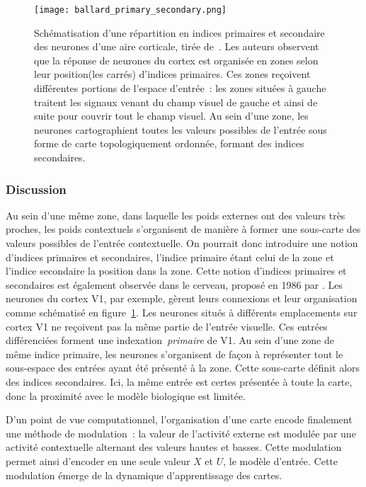 \documentclass[../main]{subfiles}
\begin{document}
\begin{figure}
	\centering\texttt{[image: ballard\_primary\_secondary.png]}
	\caption{Schématisation d'une répartition en indices primaires et secondaire des neurones d'une aire corticale, tirée de~\cite{ballard_cortical_1986}. 
	Les auteurs observent que la réponse de neurones du cortex est organisée en zones selon leur position(les carrés) d'indices primaires. 
	Ces zones reçoivent différentes portions de l'espace d'entrée~: les zones situées à gauche traitent les signaux venant du champ visuel de gauche et ainsi de suite pour couvrir tout le champ visuel.
	Au sein d'une zone, les neurones cartographient toutes les valeurs possibles de l'entrée sous forme de carte topologiquement ordonnée, formant des indices secondaires. \label{fig:ballard}}
\end{figure}

\subsubsection{Discussion}

Au sein d'une même zone, dans laquelle les poids externes ont des valeurs très proches, les poids contextuels s'organisent de manière à former une sous-carte des valeurs possibles de l'entrée contextuelle.
On pourrait donc introduire une notion d'indices primaires et secondaires, l'indice primaire étant celui de la zone et l'indice secondaire la position dans la zone.
Cette notion d'indices primaires et secondaires est également observée dans le cerveau, proposé en 1986 par \cite{ballard_cortical_1986}. Les neurones du cortex V1, par exemple, gèrent leurs connexions et leur organisation comme schématisé en figure~\ref{fig:ballard}.
Les neurones situés à différents emplacements sur cortex V1 ne reçoivent pas la même partie de l'entrée visuelle. Ces entrées différenciées forment une indexation~\emph{primaire} de V1. Au sein d'une zone de même indice primaire, les neurones s'organisent de façon à représenter tout le sous-espace des entrées ayant été présenté à la zone. Cette sous-carte définit alors des indices secondaires.
Ici, la même entrée est certes présentée à toute la carte, donc la proximité avec le modèle biologique est limitée.

D'un point de vue computationnel, l'organisation d'une carte encode finalement une méthode de modulation~: la valeur de l'activité externe est modulée par une activité contextuelle alternant des valeurs hautes et basses. Cette modulation permet ainsi d'encoder en une seule valeur $X$ et $U$, le modèle d'entrée. Cette modulation émerge de la dynamique d'apprentissage des cartes.
\end{document}
